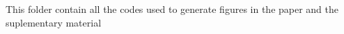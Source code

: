 This folder contain all the codes used to generate figures in the paper and the suplementary material 
